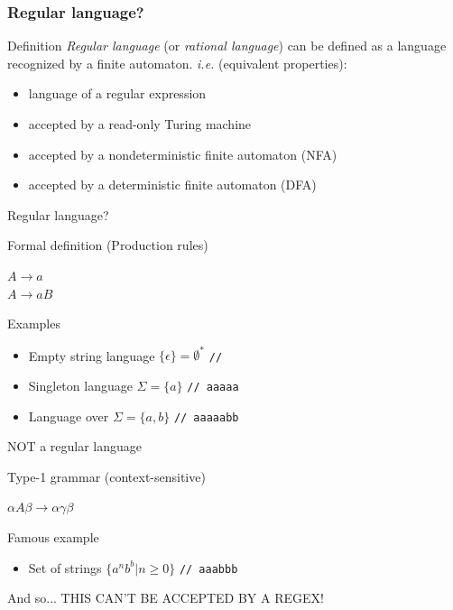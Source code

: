 \documentclass[aspectratio=169,xcolor=table]{beamer}
\newcommand\tab[1][1cm]{\hspace*{#1}}
\begin{document}
\begin{frame}
  \frametitle{Regular language?}
  \begin{block}{Definition}
    \textit{Regular language} (or \textit{rational language}) can be
    defined as a language recognized by a finite automaton.
    \textit{i.e.} (equivalent properties):
    \begin{itemize}
    \item language of a regular expression \pause
    \item accepted by a read-only Turing machine \pause
    \item accepted by a nondeterministic finite automaton (NFA) \pause
    \item accepted by a deterministic finite automaton (DFA)
    \end{itemize}
  \end{block}
\end{frame}


\begin{frame}{Regular language?}
  \begin{block}{Formal definition (Production rules)}
    \begin{center}
      $ A \to a $ \\
      $ A \to aB $
    \end{center}
  \end{block}
  \begin{exampleblock}{Examples}
    \begin{itemize}
    \item Empty string language $\{\epsilon\} = \emptyset^{*}$ \tab[1.3cm] \texttt{// }
    \item Singleton language $\Sigma = \{a\}$ \tab \tab \texttt{// aaaaa}
    \item Language over $\Sigma = \{a,b\}$ \tab[2.15cm] \texttt{// aaaaabb}
    \end{itemize}
  \end{exampleblock}
\end{frame}


\begin{frame}{NOT a regular language}
  \begin{block}{Type-1 grammar (context-sensitive)}
    \begin{center}
      $\alpha A \beta \to \alpha \gamma \beta$
    \end{center}
  \end{block}
  \pause
  \begin{exampleblock}{Famous example}
    \begin{itemize}
    \item Set of strings $\{a^{n}b^{b} | n \geq 0 \}$ \tab \texttt{// aaabbb}
    \end{itemize}
  \end{exampleblock}
  \pause
  \begin{alertblock}{And so...}
    THIS CAN'T BE ACCEPTED BY A REGEX!
  \end{alertblock}
\end{frame}
\end{document}
